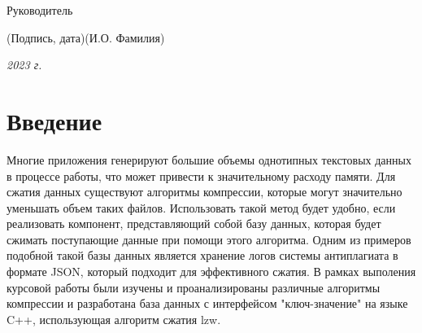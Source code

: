 \documentclass[14pt, russian]{scrartcl}
\begin{document}
\begin{titlepage}
\bigskip

\noindent Руководитель  \hfill \underline{\hspace{4cm}}\quad
\underline{\hspace{4cm}}

\vspace{-2ex}
\noindent\hspace{13.5ex}\normalsize\hspace{170pt}\hspace{2ex}\scriptsize{(Подпись, дата)}\normalsize\hspace{30pt}\hspace{6ex}\scriptsize{(И.О. Фамилия)}\normalsize
\vfill

 


\begin{center}
\textsl{2023 г.}
\end{center}
\end{titlepage}


\setlength{\tabcolsep}{3pt}
\newpage
\setcounter{page}{2}

\newpage
\renewcommand\contentsname{\hfill{\normalfont{СОДЕРЖАНИЕ}}\hfill}  %
\tableofcontents
\newpage

\section{Введение} %
Многие приложения генерируют большие объемы однотипных текстовых данных в процессе работы, что может привести к значительному расходу памяти. Для сжатия данных существуют алгоритмы компрессии, которые могут значительно уменьшать объем таких файлов. Использовать такой метод будет удобно, если реализовать компонент, представляющий собой базу данных, которая будет сжимать поступающие данные при помощи этого алгоритма. Одним из примеров подобной такой базы данных является хранение логов системы антиплагиата в формате JSON, который подходит для эффективного сжатия. В рамках выполения курсовой работы были изучены и проанализированы различные алгоритмы компрессии и разработана база данных с интерфейсом "ключ-значение" на языке C++, использующая алгоритм сжатия lzw.
\end{document}
